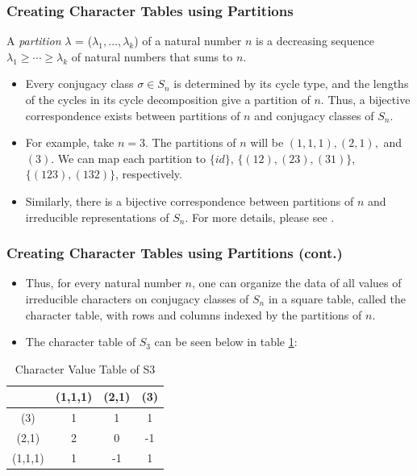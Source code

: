 \documentclass{beamer}
\begin{document}
\begin{frame}
\frametitle{Creating Character Tables using Partitions}
\begin{definition} 
    A \textit{partition} $\lambda$ = ($\lambda_{1}, \dotsc, \lambda_{k}$) of a natural number $n$ is a decreasing sequence $\lambda_{1} \geq \dotsb \geq \lambda_{k}$ of natural numbers that sums to $n$.
    \label{def:partition} 
\end{definition}

\begin{itemize}
    \item Every conjugacy class $\sigma \in S_{n}$ is determined by its cycle type, and the lengths of the cycles in its cycle decomposition give a partition of $n$. Thus, a bijective correspondence exists between partitions of $n$ and conjugacy classes of $S_{n}$. 
    \item For example, take $n=3$. The partitions of $n$ will be $(1,1,1), (2,1),$ and $(3)$. We can map each partition to $\{id\}$, $\{(12), (23), (31)\}$, $\{(123), (132)\}$, respectively.
    \item Similarly, there is a bijective correspondence between partitions of $n$ and irreducible representations of $S_{n}$. For more details, please see \cite{Zhao08youngta}.
\end{itemize}
\end{frame}


\begin{frame}
\frametitle{Creating Character Tables using Partitions (cont.)}
\begin{itemize}
    \item Thus, for every natural number $n$, one can organize the data of all values of irreducible characters on conjugacy classes of $S_{n}$ in a square table, called the character table, with rows and columns indexed by the partitions of $n$. 
    \item The character table of $S_{3}$ can be seen below in table \ref{tab:s3}:
\end{itemize}

\begin{table}[htbp]
    \centering
    \label{tab:s3}
    \begin{tabular}{c|c c c}
        & (1,1,1) & (2,1) & (3) \\
        \hline
        (3) & 1 & 1 & 1 \\
        (2,1) & 2 & 0 & -1 \\
        (1,1,1) & 1 & -1 & 1 \\
    \end{tabular}
    \caption{Character Value Table of S3}
\end{table}
\end{frame}
\end{document}
